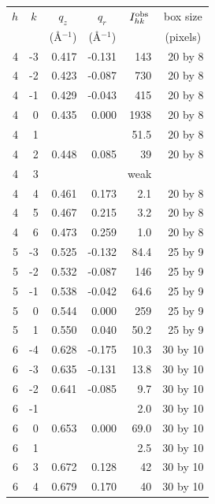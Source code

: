 \begin{table}[htbp]
  \centering
  \begin{tabular}{rrrrrr}
    \hline
    \multicolumn{1}{c}{$h$} & \multicolumn{1}{c}{$k$} & \multicolumn{1}{c}{$q_z$} & \multicolumn{1}{c}{$q_r$} & \multicolumn{1}{c}{$I_{hk}^\textrm{obs}$} & \multicolumn{1}{c}{box size} \\
     & & \multicolumn{1}{c}{(\AA$^{-1}$)} & \multicolumn{1}{c}{(\AA$^{-1}$)} & & \multicolumn{1}{c}{(pixels)} \\ 
    \hline
    4 &	-3 & 0.417 & -0.131 &    143 & 20 by 8 \\
    4 &	-2 & 0.423 & -0.087 &	   730 & 20 by 8 \\
    4	& -1 & 0.429 & -0.043	&    415 & 20 by 8 \\
    4	&  0 & 0.435 &  0.000 &   1938 & 20 by 8 \\
    4	&  1 &       &        &   51.5 & 20 by 8 \\
    4	&  2 & 0.448 &  0.085 &     39 & 20 by 8 \\
    4	&  3 &       &        &   weak & \\
    4	&  4 & 0.461 &  0.173 &    2.1 & 20 by 8 \\
    4	&  5 & 0.467 &  0.215 &    3.2 & 20 by 8 \\
    4 &	 6 & 0.473 &  0.259 &    1.0 & 20 by 8 \\
    5 & -3 & 0.525 & -0.132 &   84.4 & 25 by 9 \\
    5 & -2 & 0.532 & -0.087	&    146 & 25 by 9 \\
    5 & -1 & 0.538 & -0.042	&   64.6 & 25 by 9 \\
    5	&  0 & 0.544 &  0.000	&    259 & 25 by 9 \\
    5	&  1 & 0.550 &  0.040	&   50.2 & 25 by 9 \\
    6 &	-4 & 0.628 & -0.175	&	  10.3 & 30 by 10 \\
    6 &	-3 & 0.635 & -0.131	&	  13.8 & 30 by 10 \\
    6	& -2 & 0.641 & -0.085	&    9.7 & 30 by 10 \\
    6	& -1 &       &        &    2.0 & 30 by 10 \\
    6	&  0 & 0.653 &  0.000	&	  69.0 & 30 by 10 \\
    6	&  1 &       &        &    2.5 & 30 by 10 \\
    6	&  3 & 0.672 &  0.128 &	    42 & 30 by 10 \\
    6	&  4 & 0.679 &  0.170 &     40 & 30 by 10 \\

\end{tabular}
\end{table}
